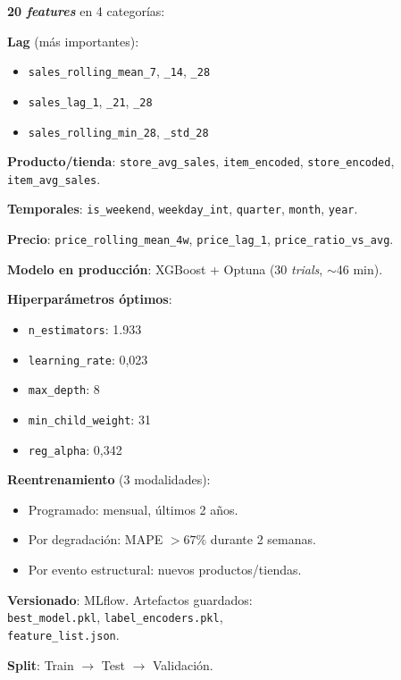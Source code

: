 \documentclass[12pt, a4paper, oneside]{report}
\newcommand{\code}[1]{\texttt{\small\color{codeblue}#1}}
\begin{document}
\noindent
\begin{minipage}[t]{0.485\textwidth}
\begin{tcolorbox}[canvasbox, title={7.\ Features}]
{\small
\textbf{20 \textit{features}} en 4 categor\'ias:

\smallskip
\textbf{Lag} (m\'as importantes):
\begin{itemize}[noitemsep, leftmargin=*, topsep=1pt]
  \item \code{sales\_rolling\_mean\_7}, \code{\_14}, \code{\_28}
  \item \code{sales\_lag\_1}, \code{\_21}, \code{\_28}
  \item \code{sales\_rolling\_min\_28}, \code{\_std\_28}
\end{itemize}

\smallskip
\textbf{Producto/tienda}:
\code{store\_avg\_sales}, \code{item\_encoded}, \code{store\_encoded}, \code{item\_avg\_sales}.

\smallskip
\textbf{Temporales}:
\code{is\_weekend}, \code{weekday\_int}, \code{quarter}, \code{month}, \code{year}.

\smallskip
\textbf{Precio}:
\code{price\_rolling\_mean\_4w}, \code{price\_lag\_1}, \code{price\_ratio\_vs\_avg}.
}
\end{tcolorbox}
\end{minipage}
\hfill
\begin{minipage}[t]{0.485\textwidth}
\begin{tcolorbox}[canvasbox, title={8.\ Building Models}]
{\small
\textbf{Modelo en producci\'on}: XGBoost + Optuna (30 \textit{trials}, $\sim$46 min).

\medskip
\textbf{Hiperpar\'ametros \'optimos}:
\begin{itemize}[noitemsep, leftmargin=*, topsep=2pt]
  \item \code{n\_estimators}: 1.933
  \item \code{learning\_rate}: 0,023
  \item \code{max\_depth}: 8
  \item \code{min\_child\_weight}: 31
  \item \code{reg\_alpha}: 0,342
\end{itemize}

\medskip
\textbf{Reentrenamiento} (3 modalidades):
\begin{itemize}[noitemsep, leftmargin=*, topsep=2pt]
  \item Programado: mensual, \'ultimos 2 a\~nos.
  \item Por degradaci\'on: MAPE $> 67\%$ durante 2 semanas.
  \item Por evento estructural: nuevos productos/tiendas.
\end{itemize}

\medskip
\textbf{Versionado}: MLflow. Artefactos guardados:\\
\code{best\_model.pkl}, \code{label\_encoders.pkl},\\
\code{feature\_list.json}.

\medskip
\textbf{Split}: Train $\rightarrow$ Test $\rightarrow$ Validaci\'on.
}
\end{tcolorbox}
\end{minipage}
\end{document}
